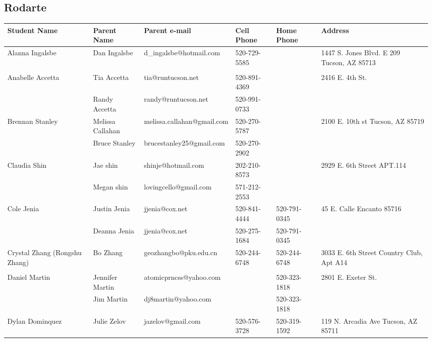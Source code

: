 \documentclass[landscape]{article}\usepackage[]{graphicx}\usepackage[]{color}
\begin{document}
\subsection{Rodarte}
\begin{longtable}{|p{100pt}|p{100pt}|p{140pt}|p{60pt}|p{64pt}|p{120pt}|}
\textbf{Student Name} & \textbf{Parent Name} & \textbf{Parent e-mail} & \textbf{Cell Phone} & \textbf{Home Phone} & \textbf{Address}\\
\hline
\hline
\multirow{2}{100pt}{Alanna Ingalsbe} & Dan Ingalsbe & d\_ingalsbe@hotmail.com & 520-729-5585 &  & \multirow{2}{120pt}{1447 S. Jones Blvd. E 209 Tucson, AZ 85713} \\
 &  &  &  &  & \\
\hline
\multirow{2}{100pt}{Anabelle Accetta} & Tia Accetta & tia@runtucson.net & 520-891-4369 &  & \multirow{2}{120pt}{2416 E. 4th St.} \\
 & Randy Accetta & randy@runtucson.net & 520-991-0733 &  & \\
\hline
\multirow{2}{100pt}{Brennan Stanley} & Melissa Callahan & melissa.callahan@gmail.com & 520-270-5787 &  & \multirow{2}{120pt}{2100 E. 10th st Tucson, AZ 85719} \\
 & Bruce Stanley & brucestanley25@gmail.com & 520-270-2902 &  & \\
\hline
\multirow{2}{100pt}{Claudia Shin} & Jae shin & shinje@hotmail.com & 202-210-8573 &  & \multirow{2}{120pt}{2929 E. 6th Street APT.114} \\
 & Megan shin & lovingcello@gmail.com & 571-212-2553 &  & \\
\hline
\multirow{2}{100pt}{Cole Jenia} & Justin Jenia & jjenia@cox.net & 520-841-4444 & 520-791-0345 & \multirow{2}{120pt}{45 E. Calle Encanto 85716} \\
 & Deanna Jenia & jjenia@cox.net & 520-275-1684 & 520-791-0345 & \\
\hline
\multirow{2}{100pt}{Crystal Zhang (Rongshu Zhang)} & Bo Zhang & geozhangbo@pku.edu.cn & 520-244-6748 & 520-244-6748 & \multirow{2}{120pt}{3033 E. 6th Street Country Club, Apt A14} \\
 &  &  &  &  & \\
\hline
\multirow{2}{100pt}{Daniel Martin} & Jennifer Martin & atomicprncss@yahoo.com &  & 520-323-1818 & \multirow{2}{120pt}{2801 E. Exeter St.} \\
 & Jim Martin & dj8martin@yahoo.com &  & 520-323-1818 & \\
\hline
\multirow{2}{100pt}{Dylan Dominquez} & Julie Zelov & jazelov@gmail.com & 520-576-3728 & 520-319-1592 & \multirow{2}{120pt}{119 N. Arcadia Ave Tucson, AZ 85711} \\

\end{longtable}
\end{document}
